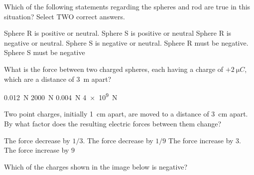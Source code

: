 \documentclass[]{exam}
\begin{document}
\begin{questions}
\begin{center}
\end{center}

Which of the following statements regarding the spheres and rod are true in this situation? Select TWO correct answers.

\begin{randomizechoices}
    \choice Sphere R is positive or neutral.
    \choice Sphere S is positive or neutral
    \choice Sphere R is negative or neutral.
    \choice Sphere S is negative or neutral.
    \choice Sphere R must be negative.
    \choice Sphere S must be negative
\end{randomizechoices}

\ifprintanswers \else \clearpage \fi

\question
What is the force between two charged spheres, each having a charge of $+\SI{2}{\micro C}$, which are a distance of \SI{3}{m} apart?

\begin{randomizechoices}
    \choice \SI{0.012}{N}
    \choice \SI{2000}{N}
    \correctchoice \SI{0.004}{N}
    \choice \SI{4e9}{N}
\end{randomizechoices}

\question
Two point charges, initially \SI{1}{cm} apart, are moved to a distance of \SI{3}{cm} apart. By what factor does the resulting electric forces between them change?

\begin{randomizechoices}
    \choice The force decrease by $1/3$.
    \correctchoice The force decrease by $1/9$
    \choice The force increase by $3$.
    \choice The force increase by $9$
\end{randomizechoices}

\question
Which of the charges shown in the image below is negative?


\end{questions}
\end{document}
